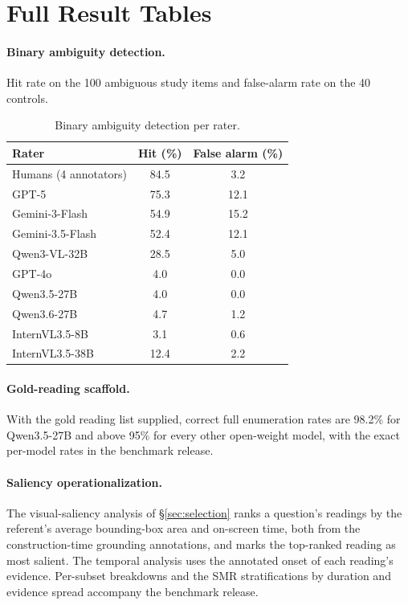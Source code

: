 \section{Full Result Tables}
\label{app:fulltables}

\paragraph{Binary ambiguity detection.} Hit rate on the 100 ambiguous study items and false-alarm rate on the 40 controls.

\begin{table}[h]
\centering
\small
\begin{tabular}{@{}lcc@{}}
\toprule
Rater & Hit (\%) & False alarm (\%) \\
\midrule
Humans (4 annotators) & 84.5 & 3.2 \\
GPT-5 & 75.3 & 12.1 \\
Gemini-3-Flash & 54.9 & 15.2 \\
Gemini-3.5-Flash & 52.4 & 12.1 \\
Qwen3-VL-32B & 28.5 & 5.0 \\
GPT-4o & 4.0 & 0.0 \\
Qwen3.5-27B & 4.0 & 0.0 \\
Qwen3.6-27B & 4.7 & 1.2 \\
InternVL3.5-8B & 3.1 & 0.6 \\
InternVL3.5-38B & 12.4 & 2.2 \\
\bottomrule
\end{tabular}
\caption{Binary ambiguity detection per rater.}
\label{tab:detection}
\end{table}

\paragraph{Gold-reading scaffold.} With the gold reading list supplied, correct full enumeration rates are 98.2\% for Qwen3.5-27B and above 95\% for every other open-weight model, with the exact per-model rates in the benchmark release.

\paragraph{Saliency operationalization.} The visual-saliency analysis of \S\ref{sec:selection} ranks a question's readings by the referent's average bounding-box area and on-screen time, both from the construction-time grounding annotations, and marks the top-ranked reading as most salient. The temporal analysis uses the annotated onset of each reading's evidence. Per-subset breakdowns and the SMR stratifications by duration and evidence spread accompany the benchmark release.
